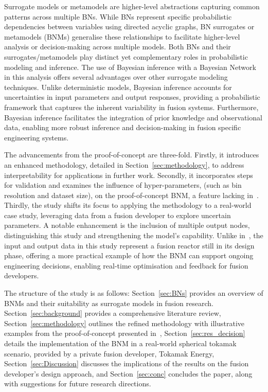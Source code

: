 \documentclass[journal]{IEEEtran}
\begin{document}
Surrogate models or metamodels are higher-level abstractions capturing common patterns across multiple BNs. While BNs represent specific probabilistic dependencies between variables using directed acyclic graphs, BN surrogates or metamodels (BNMs) generalise these relationships to facilitate higher-level analysis or decision-making across multiple models. Both BNs and their surrogates/metamodels play distinct yet complementary roles in probabilistic modeling and inference. The use of Bayesian inference with a Bayesian Network in this analysis offers several advantages over other surrogate modeling techniques. Unlike deterministic models, Bayesian inference accounts for uncertainties in input parameters and output responses, providing a probabilistic framework that captures the inherent variability in fusion systems. Furthermore, Bayesian inference facilitates the integration of prior knowledge and observational data, enabling more robust inference and decision-making in fusion specific engineering systems.

The advancements from the proof-of-concept are three-fold. Firstly, it introduces an enhanced methodology, detailed in Section~\ref{sec:methodology}, to address interpretability for applications in further work. Secondly, it incorporates steps for validation and examines the influence of hyper-parameters, (such as bin resolution and dataset size), on the proof-of-concept BNM, a feature lacking in~\cite{Griffiths2024}. Thirdly, the study shifts its focus to applying the methodology to a real-world case study, leveraging data from a fusion developer to explore uncertain parameters. A notable enhancement is the inclusion of multiple output nodes, distinguishing this study and strengthening the model's capability. Unlike in~\cite{Griffiths2024}, the input and output data in this study represent a fusion reactor still in its design phase, offering a more practical example of how the BNM can support ongoing engineering decisions, enabling real-time optimisation and feedback for fusion developers.

The structure of the study is as follows: Section~\ref{sec:BNs} provides an overview of BNMs and their suitability as surrogate models in fusion research. Section~\ref{sec:background} provides a comprehensive literature review, Section~\ref{sec:methodology} outlines the refined methodology with illustrative examples from the proof-of-concept presented in~\cite{Griffiths2024}, Section~\ref{sec:res_decision} details the implementation of the BNM in a real-world spherical tokamak scenario, provided by a private fusion developer, Tokamak Energy, Section~\ref{sec:Discussion} discusses the implications of the results on the fusion developer's design approach, and Section~\ref{sec:conc} concludes the paper, along with suggestions for future research directions.
\end{document}
